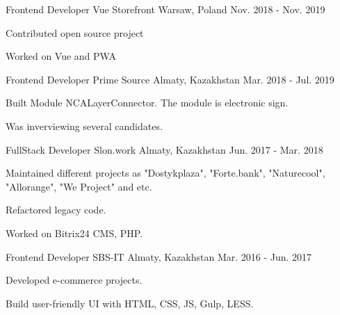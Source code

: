 \begin{cventries}
  \cventry
    {Frontend Developer} %
    {Vue Storefront} %
    {Warsaw, Poland} %
    {Nov. 2018 - Nov. 2019} %
    {
      \begin{cvitems} %
        \item {Contributed open source project}
        \item {Worked on Vue and PWA}
      \end{cvitems}
    }

  \cventry
    {Frontend Developer} %
    {Prime Source} %
    {Almaty, Kazakhstan} %
    {Mar. 2018 - Jul. 2019} %
    {
      \begin{cvitems} %
        \item {Built Module NCALayerConnector. The module is electronic sign.}
        \item {Was inverviewing several candidates.}
      \end{cvitems}
    }

  \cventry
    {FullStack Developer} %
    {Slon.work} %
    {Almaty, Kazakhstan} %
    {Jun. 2017 - Mar. 2018} %
    {
      \begin{cvitems} %
        \item {Maintained different projects as "Dostykplaza", "Forte.bank", "Naturecool", "Allorange", "We Project" and etc.}
        \item {Refactored legacy code.}
        \item {Worked on Bitrix24 CMS, PHP.}
      \end{cvitems}
    }

  \cventry
    {Frontend Developer} %
    {SBS-IT} %
    {Almaty, Kazakhstan} %
    {Mar. 2016 - Jun. 2017} %
    {
      \begin{cvitems} %
        \item {Developed e-commerce projects.}
        \item {Build user-friendly UI with HTML, CSS, JS, Gulp, LESS.}
      \end{cvitems}
    }


\end{cventries}
